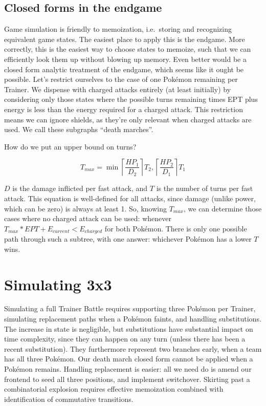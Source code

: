 \subsection{Closed forms in the endgame\label{subsec:endgame}}
Game simulation is friendly to memoization, i.e.\ storing and recognizing equivalent game states.
The easiest place to apply this is the endgame.
More correctly, this is the easiest way to choose states to memoize,
  such that we can efficiently look them up without blowing up memory.
Even better would be a closed form analytic treatment of the endgame,
  which seems like it ought be possible.
Let's restrict ourselves to the case of one Pokémon remaining per Trainer.
We dispense with charged attacks entirely (at least initially) by considering
  only those states where the possible turns remaining times EPT plus
  energy is less than the energy required for a charged attack.
This restriction means we can ignore shields, as they're only relevant
  when charged attacks are used.
We call these subgraphs ``death marches''.

How do we put an upper bound on turns?

\[ T_{max} = \min \left\lceil\frac{HP_1}{D_2}\right\rceil T_2,\left\lceil\frac{HP_2}{D_1}\right\rceil T_1 \]

$D$ is the damage inflicted per fast attack, and $T$ is the number of turns per fast attack.
This equation is well-defined for all attacks, since damage (unlike power,
  which can be zero) is always at least 1.
So, knowing $T_{max}$, we can determine those cases where no charged attack
  can be used: whenever $T_{max} * EPT + E_{current} < E_{charged}$ for both Pokémon.
There is only one possible path through such a subtree, with one answer:
  whichever Pokémon has a lower $T$ wins.

\section{Simulating 3x3\label{sec:simul3x3}}
Simulating a full Trainer Battle requires supporting three Pokémon per Trainer,
  simulating replacement paths when a Pokémon faints,
  and handling substitutions.
The increase in state is negligible, but substitutions have substantial impact on time complexity,
  since they can happen on any turn (unless there has been a recent substitution).
They furthermore represent two branches early, when a team has all three Pokémon.
Our death march closed form cannot be applied when a Pokémon remains.
Handling replacement is easier: all we need do is amend our frontend to
  seed all three positions, and implement switchover.
Skirting past a combinatorial explosion requires effective memoization combined with
 identification of commutative transitions.


